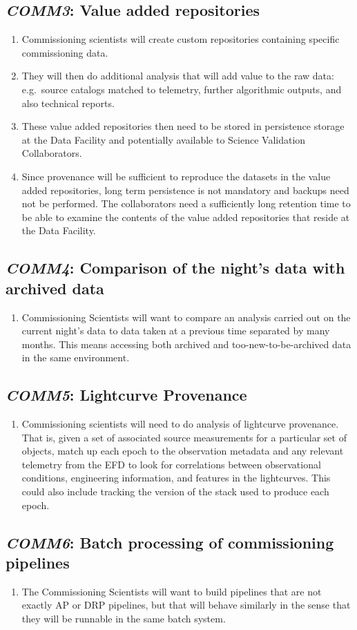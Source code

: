 \documentclass[DM,toc,lsstdraft]{lsstdoc}
\newcommand{\usecase}[3]{%
\subsection{\emph{#1}: #2}
\label{use:#1}
\begin{enumerate}[label=\alph*.]
#3
\end{enumerate}
}
\begin{document}
\usecase{COMM3}{Value added repositories}{%

\item
Commissioning scientists will create custom repositories containing specific commissioning data.

\item
They will then do additional analysis that will add value to the raw data: e.g.\ source catalogs matched to telemetry, further algorithmic outputs, and also technical reports.

\item
These value added repositories then need to be stored in persistence storage at the Data Facility and potentially available to Science Validation Collaborators.

\item
Since provenance will be sufficient to reproduce the datasets in the value added repositories, long term persistence is not mandatory and backups need not be performed.
The collaborators need a sufficiently long retention time to be able to examine the contents of the value added repositories that reside at the Data Facility.

}


\usecase{COMM4}{Comparison of the night's data with archived data}{%

\item
Commissioning Scientists will want to compare an analysis carried out on the current night's data to data taken at a previous time separated by many months.
This means accessing both archived and too-new-to-be-archived data in the same environment.

}

\usecase{COMM5}{Lightcurve Provenance}{%

\item
Commissioning scientists will need to do analysis of lightcurve provenance.
That is, given a set of associated source measurements for a particular set of objects, match up each epoch to the observation metadata and any relevant telemetry from the EFD to look for correlations between observational conditions, engineering information, and features in the lightcurves.
This could also include tracking the version of the stack used to produce each epoch.

}

\usecase{COMM6}{Batch processing of commissioning pipelines}{%

\item
The Commissioning Scientists will want to build pipelines that are not exactly AP or DRP pipelines, but that will behave similarly in the sense that they will be runnable in the same batch system.

}
\end{document}
